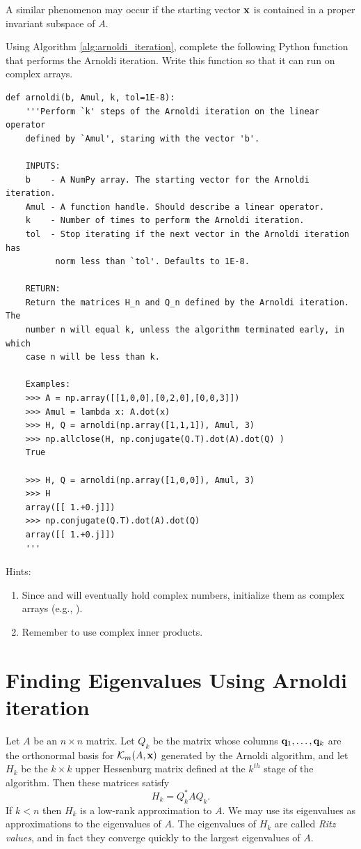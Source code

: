 A similar phenomenon may occur if the starting vector ${\bf x}$ is contained in a proper invariant subspace of $A$.

\begin{problem}\label{prob:arnoldi}
Using Algorithm \ref{alg:arnoldi_iteration}, complete the following Python function that performs the Arnoldi iteration.
Write this function so that it can run on complex arrays.
\begin{lstlisting}
def arnoldi(b, Amul, k, tol=1E-8):
    '''Perform `k' steps of the Arnoldi iteration on the linear operator 
    defined by `Amul', staring with the vector 'b'.
    
    INPUTS:
    b    - A NumPy array. The starting vector for the Arnoldi iteration.
    Amul - A function handle. Should describe a linear operator.
    k    - Number of times to perform the Arnoldi iteration.
    tol  - Stop iterating if the next vector in the Arnoldi iteration has 
          norm less than `tol'. Defaults to 1E-8.
    
    RETURN:
    Return the matrices H_n and Q_n defined by the Arnoldi iteration. The 
    number n will equal k, unless the algorithm terminated early, in which 
    case n will be less than k.
    
    Examples:
    >>> A = np.array([[1,0,0],[0,2,0],[0,0,3]])
    >>> Amul = lambda x: A.dot(x)
    >>> H, Q = arnoldi(np.array([1,1,1]), Amul, 3)
    >>> np.allclose(H, np.conjugate(Q.T).dot(A).dot(Q) )
    True
    
    >>> H, Q = arnoldi(np.array([1,0,0]), Amul, 3)
    >>> H
    array([[ 1.+0.j]])
    >>> np.conjugate(Q.T).dot(A).dot(Q)
    array([[ 1.+0.j]])
    '''
\end{lstlisting}
Hints: 
\begin{enumerate}
\item Since  and  will eventually hold complex numbers, initialize them as complex arrays (e.g., ). 
\item Remember to use complex inner products. 
\end{enumerate}
\end{problem}



\section*{Finding Eigenvalues Using Arnoldi iteration}
Let $A$ be an $n \times n$ matrix. 
Let $Q_k$ be the matrix whose columns ${\bf q}_1, \ldots, {\bf q}_k$ are the orthonormal basis for $\mathcal{K}_m(A, {\bf x})$ generated by the Arnoldi algorithm, and
let $H_k$ be the $k\times k$ upper Hessenburg matrix defined at the $k^{th}$ stage of the algorithm.
Then these matrices satisfy
\begin{equation}\label{equ:hqa}
H_k = Q_k^* A Q_k.
\end{equation}
If $k<n$ then $H_k$ is a low-rank approximation to $A$.
We may use its eigenvalues as approximations to the eigenvalues of $A$.
The eigenvalues of $H_k$ are called \emph{Ritz values}, and in fact they converge quickly to the largest eigenvalues of $A$.

